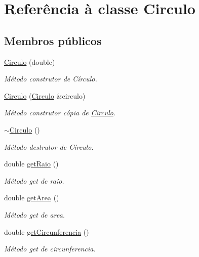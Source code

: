 \hypertarget{classCirculo}{\section{Referência à classe Circulo}
\label{classCirculo}
}
\subsection*{Membros públicos}
\begin{DoxyCompactItemize}
\item 
\hyperlink{classCirculo_a2e4f6526706611ceccd90f4e8bef7795}{Circulo} (double)
\begin{DoxyCompactList}\small\item\em Método construtor de Círculo. \end{DoxyCompactList}\item 
\hyperlink{classCirculo_a01a523953263f160d46835aa7aa97df1}{Circulo} (\hyperlink{classCirculo}{Circulo} \&circulo)
\begin{DoxyCompactList}\small\item\em Método construtor cópia de \hyperlink{classCirculo}{Circulo}. \end{DoxyCompactList}\item 
\hypertarget{classCirculo_a8efe39e0e89487519cd802f0738d3bf4}{\hyperlink{classCirculo_a8efe39e0e89487519cd802f0738d3bf4}{$\sim$\-Circulo} ()}\label{classCirculo_a8efe39e0e89487519cd802f0738d3bf4}

\begin{DoxyCompactList}\small\item\em Método destrutor de Círculo. \end{DoxyCompactList}\item 
double \hyperlink{classCirculo_a1c475b6bc5e02d0975f8c79b1654f66d}{get\-Raio} ()
\begin{DoxyCompactList}\small\item\em Método get de raio. \end{DoxyCompactList}\item 
double \hyperlink{classCirculo_a882fbba36f59e329a9f45dfc611e1ed3}{get\-Area} ()
\begin{DoxyCompactList}\small\item\em Método get de area. \end{DoxyCompactList}\item 
double \hyperlink{classCirculo_a606dbae3af0d2894104466b2afeb486e}{get\-Circunferencia} ()
\begin{DoxyCompactList}\small\item\em Método get de circunferencia. \end{DoxyCompactList}\end{DoxyCompactItemize}
